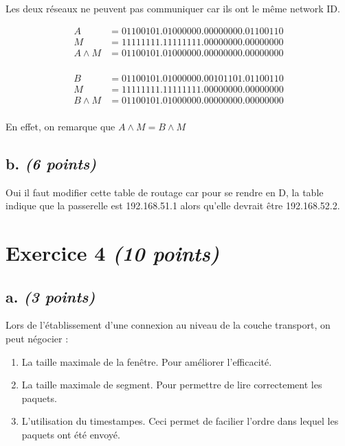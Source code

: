 \documentclass{article}
\begin{document}
Les deux réseaux ne peuvent pas communiquer car ils ont le même network ID.


\noindent \begin{minipage}{9cm}
	\begin{align*}
		A &= 01100101.01000000.00000000.01100110\\
		M &= 11111111.11111111.00000000.00000000\\
		A \land  M &= 01100101.01000000.00000000.00000000\\
	\end{align*}
\end{minipage}
\begin{minipage}{7cm}
	\begin{align*}
		B &= 01100101.01000000.00101101.01100110\\
		M &= 11111111.11111111.00000000.00000000\\
		B \land  M &= 01100101.01000000.00000000.00000000\\
	\end{align*}
\end{minipage}

\hfill

En effet, on remarque que $A \land  M = B \land  M$

\subsection{b. \emph{(6 points)}}

Oui il faut modifier cette table de routage car pour se rendre en D, la table indique que la passerelle est 192.168.51.1 alors qu'elle devrait être 192.168.52.2.

\clearpage

\section{Exercice 4 \emph{(10 points)}}

\subsection{a. \emph{(3 points)}}

Lors de l'établissement d'une connexion au niveau de la couche transport, on peut négocier :

\begin{enumerate}
	\item La taille maximale de la fenêtre. Pour améliorer l'efficacité.
	\item La taille maximale de segment. Pour permettre de lire correctement les paquets.
	\item L'utilisation du timestampes. Ceci permet de facilier l'ordre dans lequel les paquets ont été envoyé. 
\end{enumerate}
\end{document}
